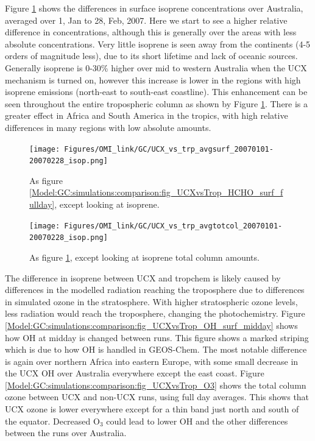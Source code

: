       Figure \ref{Model:GC:simulations:comparison:fig_UCXvsTrop_isop_surf_fullday} shows the differences in surface isoprene concentrations over Australia, averaged over 1, Jan to 28, Feb, 2007.
      Here we start to see a higher relative difference in concentrations, although this is generally over the areas with less absolute concentrations. 
      Very little isoprene is seen away from the continents (4-5 orders of magnitude less), due to its short lifetime and  lack of oceanic sources.
      Generally isoprene is 0-30\% higher over mid to western Australia when the UCX mechanism is turned on, however this increase is lower in the regions with high isoprene emissions (north-east to south-east coastline).
      This enhancement can be seen throughout the entire tropospheric column as shown by Figure \ref{Model:GC:simulations:comparison:fig_UCXvsTrop_isop_surf_fullday}.
      There is a greater effect in Africa and South America in the tropics, with high relative differences in many regions with low absolute amounts.
      
      \begin{figure}
        \texttt{[image: Figures/OMI\_link/GC/UCX\_vs\_trp\_avgsurf\_20070101-20070228\_isop.png]}
        \caption{ %
          As figure \ref{Model:GC:simulations:comparison:fig_UCXvsTrop_HCHO_surf_fullday}, except looking at isoprene. 
        }      
        \label{Model:GC:simulations:comparison:fig_UCXvsTrop_isop_surf_fullday}
      \end{figure}
      \begin{figure}
        \texttt{[image: Figures/OMI\_link/GC/UCX\_vs\_trp\_avgtotcol\_20070101-20070228\_isop.png]}
        \caption{ %
          As figure \ref{Model:GC:simulations:comparison:fig_UCXvsTrop_isop_surf_fullday}, except looking at isoprene total column amounts. 
        }      
        \label{Model:GC:simulations:comparison:fig_UCXvsTrop_isop_totcol_fullday}
      \end{figure}
      
      
      The difference in isoprene between UCX and tropchem is likely caused by differences in the modelled radiation reaching the troposphere due to differences in simulated ozone in the stratosphere.
      With higher stratospheric ozone levels, less radiation would reach the troposphere, changing the photochemistry.
      Figure \ref{Model:GC:simulations:comparison:fig_UCXvsTrop_OH_surf_midday} shows how OH at midday is changed between runs.
      This figure shows a marked striping which is due to how OH is handled in GEOS-Chem.
      The most notable difference is again over northern Africa into eastern Europe, with some small decrease in the UCX OH over Australia everywhere except the east coast.
      Figure \ref{Model:GC:simulations:comparison:fig_UCXvsTrop_O3} shows the total column ozone between UCX and non-UCX runs, using full day averages.
      This shows that UCX ozone is lower everywhere except for a thin band just north and south of the equator.
      Decreased O$_3$ could lead to lower OH and the other differences between the runs over Australia.
      
